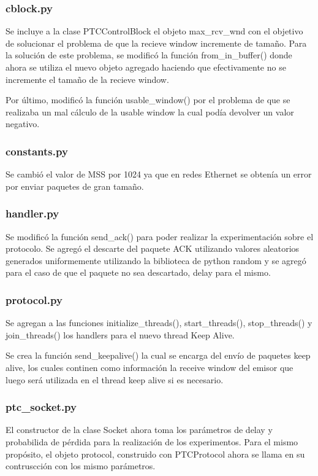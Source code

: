\documentclass[a4paper, 10pt, twoside]{article}
\begin{document}
\subsubsection{cblock.py}
Se incluye a la clase PTCControlBlock el objeto max\_rcv\_wnd con el objetivo de solucionar el problema de que la recieve window incremente de tamaño. Para la solución de este problema, se modificó la función from\_in\_buffer() donde ahora se utiliza el nuevo objeto agregado haciendo que efectivamente no se incremente el tamaño de la recieve window.

Por último, modificó la función usable\_window() por el problema de que se realizaba un mal cálculo de la usable window la cual podía devolver un valor negativo.

\subsubsection{constants.py}
Se cambió el valor de MSS por 1024 ya que en redes Ethernet se obtenía un error por enviar paquetes de gran tamaño.

\subsubsection{handler.py}
Se modificó la función send\_ack() para poder realizar la experimentación sobre el protocolo. Se agregó el descarte del paquete ACK utilizando valores aleatorios generados uniformemente utilizando la biblioteca de python random y se agregó para el caso de que el paquete no sea descartado, delay para el mismo.

\subsubsection{protocol.py}
Se agregan a las funciones initialize\_threads(), start\_threads(), stop\_threads() y join\_threads() los handlers para el nuevo thread Keep Alive.

Se crea la función send\_keepalive() la cual se encarga del envío de paquetes keep alive, los cuales continen como información la receive window del emisor que luego será utilizada en el thread keep alive si es necesario.

\subsubsection{ptc\_socket.py}
El constructor de la clase Socket ahora toma los parámetros de delay y probabilida de pérdida para la realización de los experimentos. Para el mismo propósito, el objeto protocol, construido con PTCProtocol ahora se llama en su contruscción con los mismo parámetros.
\end{document}
